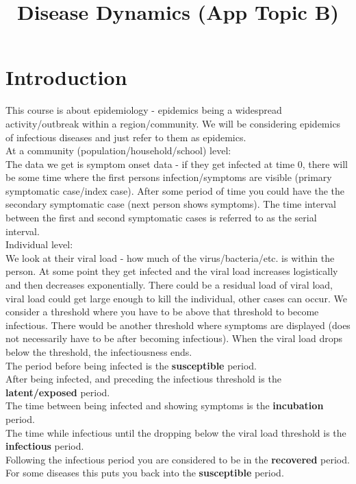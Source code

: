 \documentclass{/home/janmebows/Documents/LatexTemplates/myassignment}
\title{Disease Dynamics (App Topic B)}
\begin{document}
\setlength{\parindent}{0pt}
\maketitle

\section{Introduction}
This course is about epidemiology - epidemics being a widespread activity/outbreak within a region/community. We will be considering epidemics of infectious diseases and just refer to them as epidemics.\\

At a community (population/household/school) level:\\
The data we get is symptom onset data - if they get infected at time $0$, there will be some time where the first persons infection/symptoms are visible (primary symptomatic case/index case). After some period of time you could have the the secondary symptomatic case (next person shows symptoms).
The time interval between the first and second symptomatic cases is referred to as the serial interval. \\

Individual level:\\
We look at their viral load - how much of the virus/bacteria/etc. is within the person.
At some point they get infected and the viral load increases logistically and then decreases exponentially. There could be a residual load of viral load, viral load could get large enough to kill the individual, other cases can occur. We consider a threshold where you have to be above that threshold to become infectious. There would be another threshold where symptoms are displayed (does not necessarily have to be after becoming infectious).
When the viral load drops below the threshold, the infectiousness ends.\\

The period before being infected is the \textbf{susceptible} period.\\
After being infected, and preceding the infectious threshold is the \textbf{latent/exposed} period.\\
The time between being infected and showing symptoms is the \textbf{incubation} period.\\
The time while infectious until the dropping below the viral load threshold is the \textbf{infectious} period.\\ 
Following the infectious period you are considered to be in the \textbf{recovered} period. For some diseases this puts you back into the \textbf{susceptible} period.\\
\end{document}
